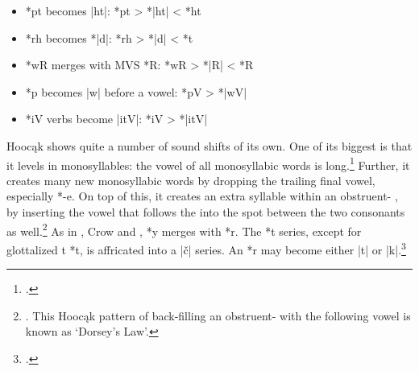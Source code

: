 \documentclass[output=paper]{LSP/langsci}
\begin{document}
\begin{itemize}
\item *pt becomes |ht|: \hspace{7em} *pt	>	*|ht|	<	*ht
\item *rh becomes *|d|: \hspace{7em} *rh	>	*|d|	<	*t
\item *wR merges with MVS *R: \hspace{3em} *wR	>	*|R|	<	*R
\item *p becomes |w| before a vowel: \hspace{1em} *pV	>	*|wV|
\item *i\textsuperscript{}V verbs become |it\textsuperscript{}V|:	\hspace{4em} *i\textsuperscript{}V	>	*|it\textsuperscript{}V|
\end{itemize}
 

Hooc\k{a}k shows quite a number of sound shifts of its own.  One of its biggest is that it levels  in monosyllables: the vowel of all monosyllabic words is long.\footnote{\citealt[303, 797]{Rankinetal2006PDF}.} Further, it creates many new monosyllabic words by dropping the trailing final vowel, especially *-e.  On top of this, it creates an extra syllable within an obstruent- , by inserting the vowel that follows the  into the spot between the two consonants as well.\footnote{\citet[123--124]{Helmbrecht2011}. This Hooc\k{a}k pattern of back-filling an obstruent-  with the following vowel is known as `Dorsey's Law'.}  As in , Crow and ,  *y merges with *r.  The *t series, except for glottalized t *t\textsuperscript{}, is affricated into a |\v{c}| series.  An *r\textsuperscript{}  may become either |t\textsuperscript{}| or |k\textsuperscript{}|.\footnote{\citealt[816-817]{Rankinetal2006PDF}.}
\end{document}
